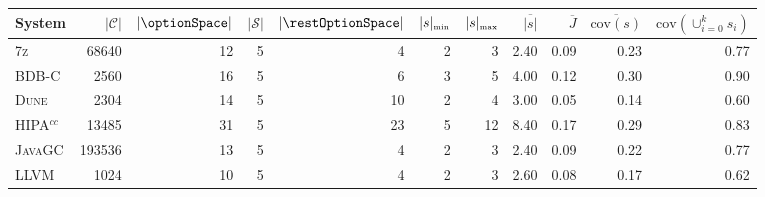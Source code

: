 \begin{tabular}{lrrrrrrrrrr}
\toprule
\multicolumn{1}{l}{System} &  $|\mathcal{C}|$ &  \multicolumn{1}{r}{$|\optionSpace|$} &  $|\mathcal{S}|$ &  \multicolumn{1}{r}{$|\restOptionSpace|$} &  $|s|_{\text{\tiny min}}$ &  $|s|_{\text{\tiny max}}$ &  \multicolumn{1}{r}{$\overline{|s|}$} &  $\overline{J}$ &  $\overline{\text{cov}(s)}$ &  ${\text{cov}(\cup_{i=0}^k s_i)}$ \\
\midrule
               \textsc{7z} &            68640 &                                    12 &                5 &                                         4 &                         2 &                         3 &                                  2.40 &            0.09 &                        0.23 &                              0.77 \\
            \textsc{BDB-C} &             2560 &                                    16 &                5 &                                         6 &                         3 &                         5 &                                  4.00 &            0.12 &                        0.30 &                              0.90 \\
             \textsc{Dune} &             2304 &                                    14 &                5 &                                        10 &                         2 &                         4 &                                  3.00 &            0.05 &                        0.14 &                              0.60 \\
      \textsc{HIPA$^{cc}$} &            13485 &                                    31 &                5 &                                        23 &                         5 &                        12 &                                  8.40 &            0.17 &                        0.29 &                              0.83 \\
           \textsc{JavaGC} &           193536 &                                    13 &                5 &                                         4 &                         2 &                         3 &                                  2.40 &            0.09 &                        0.22 &                              0.77 \\
             \textsc{LLVM} &             1024 &                                    10 &                5 &                                         4 &                         2 &                         3 &                                  2.60 &            0.08 &                        0.17 &                              0.62 \\

\end{tabular}
